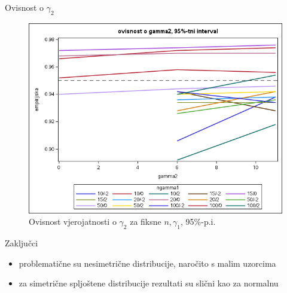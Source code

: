 \documentclass{beamer}
\begin{document}
\begin{frame}{Ovisnost o $\gamma_2$}
	\begin{figure}
		\includegraphics[scale=0.6]{assets/graf295.png}
		\centering
		\caption{Ovisnost vjerojatnosti o \( \gamma_2 \) za fiksne \( n, \gamma_1 \), 95\%-p.i.}
		\label{graf295}
	\end{figure}
\end{frame}

\begin{frame}{Zaključci}
	\begin{itemize}
		\item problematične su nesimetrične distribucije, naročito s malim uzorcima
		\item za simetrične spljoštene distribucije rezultati su slični kao za normalnu
	\end{itemize}
\end{frame}
\end{document}
